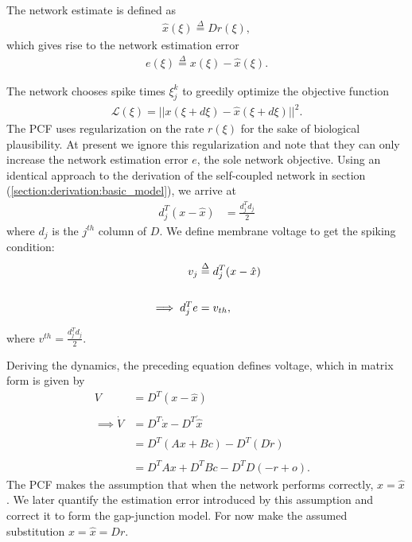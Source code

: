 \begin{enumerate}
The network estimate is defined as 
\begin{align}
\label{eq:analysis:comparison_sc_vs_pcf_vs_gj:pcf_xhat_def}
\hat{x}(\xi) \overset{\Delta}{=} D r(\xi),
\end{align}
which gives rise to the network estimation error
\begin{align}
\label{eq:analysis:comparison_sc_vs_pcf_vs_gj:pcf_error_def}
e(\xi) \overset{\Delta}{=} x(\xi) - \hat{x}(\xi).
\end{align}

The network chooses spike times $\xi_j^k$ to greedily optimize the objective function
\begin{align*}
\mathcal{L}(\xi) = ||x(\xi + d\xi) - \hat{x}(\xi + d\xi)||^2.
\end{align*}
The PCF uses regularization on the rate $r(\xi)$ for the sake of biological plausibility. At present we ignore this regularization and note that they can only increase the network estimation error $e$, the sole network objective.
Using an identical approach to the derivation of the self-coupled network in section (\ref{section:derivation:basic_model}), we arrive at 
\begin{align*}
d_j^T 
\left(
	x - \hat{x}
\right)
&= 
\frac{d_j^T d_j}{2}
\end{align*}
where $d_j$ is the $j^{th}$ column of $D$. We define membrane voltage to get the spiking condition:
\begin{align}
\label{eq:analysis:comparison_sc_vs_pcf_vs_gj:pcf_voltage_def}
v_j &\overset{\Delta}{=} d_j^T (x - \hat{x}) 
\notag
\\
\\
\notag
\implies
d_j^T e &= v_{th}, 
\end{align}

where $v^{th} = \frac{d_j^T d_j}{2}$.

Deriving the dynamics, the preceding equation defines voltage, which in matrix form is given by
\begin{align*}
V &= D^T 
\left(
	x - \hat{x}
\right)
%
\\
\\
%
\implies
\dot{V}
&= 
D^T \dot{x} - D^T \dot{\hat{x}}
&
\\
\\
%
&= D^T 
\left(
	A x + B c
\right)
 - D^T 
 \left(
 D \dot{r}
 \right)
 \\
 \\
 &= 
 D^T A x
 + D^T B c
 - D^T D
\left(
	-r + o 
\right) 
 .
\end{align*}
The PCF makes the assumption that when the network performs correctly, $x = \hat{x}$. We later quantify the estimation error introduced by this assumption and correct it to form the gap-junction model. For now make the assumed substitution $x = \hat{x} = Dr$. 


\end{enumerate}
